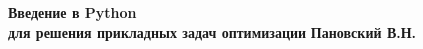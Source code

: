 \documentclass[10pt]{book}
\begin{document}
\begin{titlepage}
\begin{center}
\begin{spacing}{2.5}
{\huge\bfseries Введение в Python \\ для решения прикладных задач оптимизации}
{\Large\bfseries Пановский В.Н.}\\[5pt]
\end{spacing}
\end{center}
\end{titlepage}

\cite{Nobody06}

% 
% 
% 
% 
% 
% 



\end{document}
